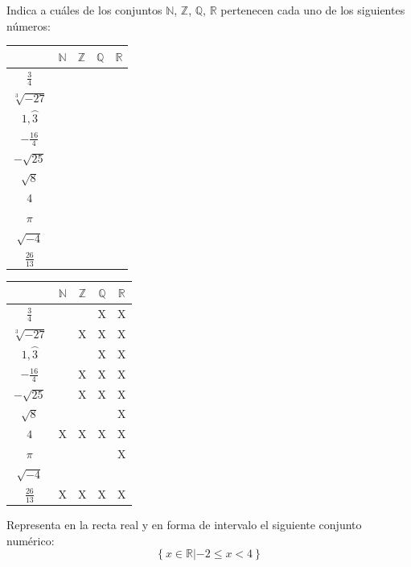 \documentclass[addpoints,spanish, 12pt,a4paper]{exam}
\begin{document}
\begin{questions}
\question[2] Indica a cuáles de los conjuntos
$\mathbb{N}$, $\mathbb{Z}$, $\mathbb{Q}$, $\mathbb{R}$ pertenecen cada uno de los siguientes números:
\begin{center}
\begin{tabular}{|c |c |c |c |c|}\hline
&$\mathbb{N}$& $\mathbb{Z}$& $\mathbb{Q}$&$\mathbb{R}$\\ 
\hline
$\frac{3}{4}$&&&&\\
\hline
$\sqrt[3]{-27}$&&&&\\
\hline
$1,\wideparen{3}$&&&&\\
\hline
$-\frac{16}{4}$&&&&\\
\hline
$-\sqrt{25}$&&&&\\
\hline
$\sqrt{8}$&&&&\\
\hline
$4$&&&&\\
\hline
$\pi$&&&&\\
\hline
$\sqrt{-4}$&&&&\\
\hline
$\frac{26}{13}$&&&&\\
\hline
\end{tabular}

\end{center}

\begin{solution}
\begin{tabular}{|c |c |c |c |c|}\hline
&$\mathbb{N}$& $\mathbb{Z}$& $\mathbb{Q}$&$\mathbb{R}$\\ 
\hline
$\frac{3}{4}$&&&X&X\\
\hline
$\sqrt[3]{-27}$&&X&X&X\\
\hline
$1,\wideparen{3}$&&&X&X\\
\hline
$-\frac{16}{4}$&&X&X&X\\
\hline
$-\sqrt{25}$&&X&X&X\\
\hline
$\sqrt{8}$&&&&X\\
\hline
$4$&X&X&X&X\\
\hline
$\pi$&&&&X\\
\hline
$\sqrt{-4}$&&&&\\
\hline
$\frac{26}{13}$&X&X&X&X\\
\hline
\end{tabular}
\end{solution}

\addpoints

\question[2] Representa en la recta real y en forma de intervalo el siguiente conjunto numérico:
\addpoints %
$$\left\{ x \in \mathbb{R} \left| -2 \leqslant x < 4 \right. \right\}$$


\end{questions}
\end{document}
